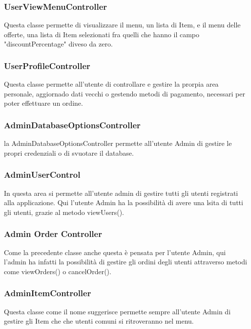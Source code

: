 \documentclass{article}
\begin{document}
\subsubsection{UserViewMenuController}
Questa classe permette di visualizzare il menu, un lista di Item, e il menu delle offerte, una lista di Item selezionati fra quelli che hanno il campo "discountPercentage" diveso da zero.

\subsubsection{UserProfileController}
Questa classe permette all'utente di controllare e gestire la prorpia area personale, aggiornado dati vecchi o gestendo metodi di pagamento, necessari per poter effettuare un ordine.

\subsubsection{AdminDatabaseOptionsController}
la AdminDatabaseOptionsController permette all'utente Admin di gestire le propri credenziali o di svuotare il database.

\subsubsection{AdminUserControl}
In questa area si permette all'utente admin di gestire tutti gli utenti registrati alla applicazione. Qui l'utente Admin ha la possibilità di avere una lsita di tutti gli utenti, grazie al metodo viewUsers().

\subsubsection{Admin Order Controller}
Come la precedente classe anche questa è pensata per l'utente Admin, qui l'admin ha infatti la possibilità di gestire gli ordini degli utenti attraverso metodi come viewOrders() o cancelOrder().

\subsubsection{AdminItemController}
Questa classe come il nome suggerisce permette sempre all'utente Admin di gestire gli Item che che utenti comuni si ritroveranno nel menu.




\newpage


\end{document}
